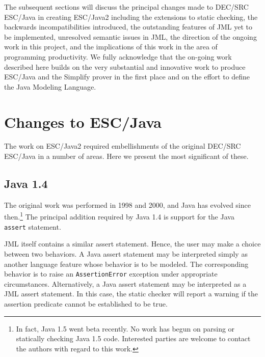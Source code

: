 \documentclass{acm_proc_article-sp}
\begin{document}
The subsequent sections will discuss the principal changes made to DEC/SRC ESC/Java in creating ESC/Java2 including the extensions to static checking, the backwards incompatibilities introduced, the outstanding features of JML yet to be implemented, unresolved semantic issues in JML, the direction of the ongoing work in this project, and the implications of this 
work in the area of programming productivity.  We fully acknowledge
that the on-going work described here builds on the very substantial
and innovative work to produce ESC/Java and the Simplify prover in the
first place and on the effort to define the Java Modeling Language.


\section{Changes to ESC/Java}

The work on ESC/Java2 required embellishments of the original DEC/SRC
ESC/Java in a number of areas.  Here we present the most significant
of these.
\subsection{Java 1.4}
The original work was performed in 1998 and 2000, and Java has evolved
since then.\footnote{In fact, Java 1.5 went beta recently.  No work has begun on
  parsing or statically checking Java 1.5 code.  Interested parties
  are welcome to contact the authors with regard to this work.}  The
principal addition required by Java 1.4 is support for the Java {\tt
  assert} statement.  

JML itself contains a similar assert statement.  Hence, the user may make a choice between
two behaviors.  A Java assert statement may be interpreted simply as another language
feature whose behavior is to be modeled.  The corresponding behavior is to raise an
 \texttt{AssertionError} exception under appropriate circumstances.  Alternatively, 
a Java assert statement may be interpreted as a JML assert statement.  In this case, the
static checker will report a warning if the assertion predicate cannot be established to be true.
\end{document}
